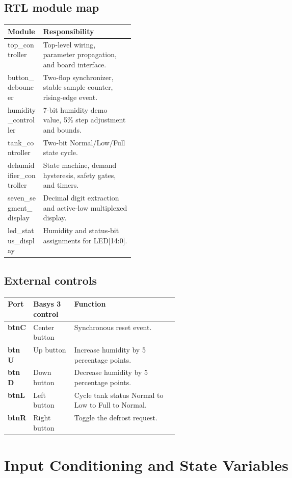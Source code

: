 \documentclass[11pt,a4paper]{article}
\begin{document}
\subsection{RTL module map}
\begin{tabularx}{\linewidth}{@{}>{\ttfamily\color{navy}}p{0.29\linewidth}X@{}}
\toprule
Module & Responsibility \\
\midrule
top\_controller & Top-level wiring, parameter propagation, and board interface. \\
button\_debouncer & Two-flop synchronizer, stable sample counter, rising-edge event. \\
humidity\_controller & 7-bit humidity demo value, 5\% step adjustment and bounds. \\
tank\_controller & Two-bit Normal/Low/Full state cycle. \\
dehumidifier\_controller & State machine, demand hysteresis, safety gates, and timers. \\
seven\_segment\_display & Decimal digit extraction and active-low multiplexed display. \\
led\_status\_display & Humidity and status-bit assignments for LED[14:0]. \\
\bottomrule
\end{tabularx}

\subsection{External controls}
\begin{tabularx}{\linewidth}{@{}>{\ttfamily\bfseries}p{0.15\linewidth}p{0.24\linewidth}X@{}}
\toprule
Port & Basys 3 control & Function \\
\midrule
btnC & Center button & Synchronous reset event. \\
btnU & Up button & Increase humidity by 5 percentage points. \\
btnD & Down button & Decrease humidity by 5 percentage points. \\
btnL & Left button & Cycle tank status Normal to Low to Full to Normal. \\
btnR & Right button & Toggle the defrost request. \\
\bottomrule
\end{tabularx}

\clearpage
\section{Input Conditioning and State Variables}
\end{document}
